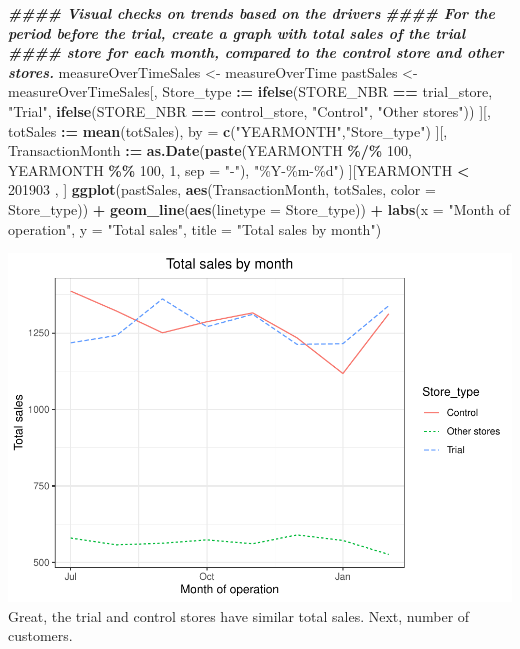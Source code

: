 \documentclass[
]{article}
\newenvironment{Shaded}{\begin{snugshade}}{\end{snugshade}}
\newcommand{\AttributeTok}[1]{\textcolor[rgb]{0.13,0.29,0.53}{#1}}
\newcommand{\DecValTok}[1]{\textcolor[rgb]{0.00,0.00,0.81}{#1}}
\newcommand{\DocumentationTok}[1]{\textcolor[rgb]{0.56,0.35,0.01}{\textbf{\textit{#1}}}}
\newcommand{\FunctionTok}[1]{\textcolor[rgb]{0.13,0.29,0.53}{\textbf{#1}}}
\newcommand{\NormalTok}[1]{#1}
\newcommand{\OtherTok}[1]{\textcolor[rgb]{0.56,0.35,0.01}{#1}}
\newcommand{\SpecialCharTok}[1]{\textcolor[rgb]{0.81,0.36,0.00}{\textbf{#1}}}
\newcommand{\StringTok}[1]{\textcolor[rgb]{0.31,0.60,0.02}{#1}}
\begin{document}
\begin{Shaded}
\begin{Highlighting}[]
\DocumentationTok{\#\#\#\# Visual checks on trends based on the drivers}
\DocumentationTok{\#\#\#\# For the period before the trial, create a graph with total sales of the trial }
\DocumentationTok{\#\#\#\# store for each month, compared to the control store and other stores.}
\NormalTok{measureOverTimeSales }\OtherTok{\textless{}{-}}\NormalTok{ measureOverTime}
\NormalTok{pastSales }\OtherTok{\textless{}{-}}\NormalTok{ measureOverTimeSales[, Store\_type }\SpecialCharTok{:=} \FunctionTok{ifelse}\NormalTok{(STORE\_NBR }\SpecialCharTok{==}\NormalTok{ trial\_store, }\StringTok{"Trial"}\NormalTok{,}
\FunctionTok{ifelse}\NormalTok{(STORE\_NBR }\SpecialCharTok{==}\NormalTok{ control\_store, }\StringTok{"Control"}\NormalTok{, }\StringTok{"Other stores"}\NormalTok{))}
\NormalTok{][, totSales }\SpecialCharTok{:=} \FunctionTok{mean}\NormalTok{(totSales), by }\OtherTok{=} \FunctionTok{c}\NormalTok{(}\StringTok{"YEARMONTH"}\NormalTok{,}\StringTok{"Store\_type"}\NormalTok{)}
\NormalTok{][, TransactionMonth }\SpecialCharTok{:=} \FunctionTok{as.Date}\NormalTok{(}\FunctionTok{paste}\NormalTok{(YEARMONTH }\SpecialCharTok{\%/\%} \DecValTok{100}\NormalTok{, YEARMONTH }\SpecialCharTok{\%\%} \DecValTok{100}\NormalTok{, }\DecValTok{1}\NormalTok{, }\AttributeTok{sep =} \StringTok{"{-}"}\NormalTok{), }\StringTok{"\%Y{-}\%m{-}\%d"}\NormalTok{)}
\NormalTok{][YEARMONTH }\SpecialCharTok{\textless{}} \DecValTok{201903}\NormalTok{ , ]}
\FunctionTok{ggplot}\NormalTok{(pastSales, }\FunctionTok{aes}\NormalTok{(TransactionMonth, totSales, }\AttributeTok{color =}\NormalTok{ Store\_type)) }\SpecialCharTok{+}
\FunctionTok{geom\_line}\NormalTok{(}\FunctionTok{aes}\NormalTok{(}\AttributeTok{linetype =}\NormalTok{ Store\_type)) }\SpecialCharTok{+}
\FunctionTok{labs}\NormalTok{(}\AttributeTok{x =} \StringTok{"Month of operation"}\NormalTok{, }\AttributeTok{y =} \StringTok{"Total sales"}\NormalTok{, }\AttributeTok{title =} \StringTok{"Total sales by month"}\NormalTok{)}
\end{Highlighting}
\end{Shaded}

\includegraphics{InsideSherpa_Task2_files/figure-latex/unnamed-chunk-22-1.pdf}
Great, the trial and control stores have similar total sales. Next,
number of customers.
\end{document}
